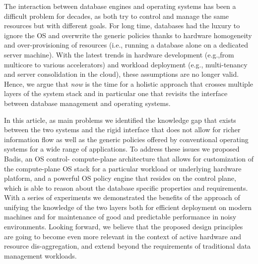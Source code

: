 \documentclass[11pt]{article}
\begin{document}
The interaction between database engines and operating systems has been a difficult
problem for decades, as both try to control and manage the same resources but with
different goals. For long time, databases had the luxury to ignore the OS and 
overwrite the generic policies thanks to hardware homogeneity and over-provisioning 
of resources (i.e., running a database alone on a dedicated server machine).
With the latest trends in hardware development (e.g.,from multicore to various 
accelerators) and workload deployment (e.g., multi-tenancy and server consolidation 
in the cloud), these assumptions are no longer valid. Hence, we argue that 
{\it now} is the time for a holistic approach that crosses multiple layers of 
the system stack and in particular one that revisits the interface between 
database management and operating systems. 

In this article, as main problems we identified the knowledge gap that exists between
the two systems and the rigid interface that does not allow for richer information
flow as well as the generic policies offered by conventional operating systems for a 
wide range of applications. To address these issues we proposed Badis, an OS 
control- compute-plane architecture that allows for customization of the compute-plane
OS stack for a particular workload or underlying hardware platform, and a 
powerful OS policy engine that resides on the control plane, which is able to reason
about the database specific properties and requirements. With a series of experiments
we demonstrated the benefits of the approach of unifying the knowledge of the two
layers both for efficient deployment on modern machines and for maintenance of good 
and predictable performance in noisy environments. Looking forward, we believe that
the proposed design principles are going to become even more relevant in the context 
of active hardware and resource dis-aggregation, and extend beyond the requirements 
of traditional data management workloads.
\end{document}
